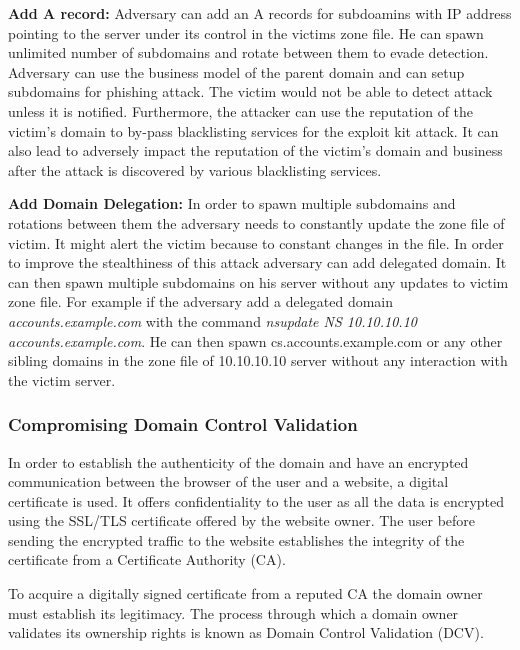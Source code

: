 \textbf{Add A record:} 
Adversary can add an A records for subdoamins with IP address pointing to the server under its control in the victims zone file. He can spawn unlimited number of subdomains and rotate between them to evade detection. Adversary can use the business model of the parent domain and can setup subdomains for phishing attack. The victim would not be able to detect attack unless it is notified. Furthermore, the attacker can use the reputation of the victim's domain to by-pass blacklisting services for the exploit kit attack. It can also lead to adversely impact the reputation of the victim's domain and business after the attack is discovered by various blacklisting services.

\textbf{Add Domain Delegation:}
In order to spawn multiple subdomains and rotations between them the adversary needs to constantly update the zone file of victim. It might alert the victim because to constant changes in the file. In order to improve the stealthiness of this attack adversary can add delegated domain. It can then spawn multiple subdomains on his server without any updates to victim zone file. For example if the adversary add a delegated domain
\textit{accounts.example.com} with the command %
\textit{nsupdate NS 10.10.10.10 accounts.example.com}. He can then spawn cs.accounts.example.com or any other sibling domains in the zone file of 10.10.10.10 server without any interaction with the victim server. 




\subsubsection{Compromising Domain Control Validation}


In order to establish the authenticity of the domain and have an encrypted communication between the browser of the user and a website, a digital certificate is used. It offers confidentiality to the user as all the data is encrypted using the SSL/TLS certificate offered by the website owner. The user before sending the encrypted traffic to the website establishes the integrity of the certificate from a  Certificate Authority (CA). 

To acquire a digitally signed certificate from a reputed CA  the domain owner must establish its legitimacy. The process through which a  domain owner validates its ownership rights is known as Domain Control Validation (DCV). 

